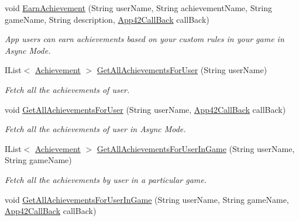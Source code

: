 \begin{DoxyCompactItemize}
void \hyperlink{classcom_1_1shephertz_1_1app42_1_1paas_1_1sdk_1_1csharp_1_1achievement_1_1_achievement_service_ab780775f471a6ac50605090d43a6c452}{Earn\+Achievement} (String user\+Name, String achievement\+Name, String game\+Name, String description, \hyperlink{interfacecom_1_1shephertz_1_1app42_1_1paas_1_1sdk_1_1csharp_1_1_app42_call_back}{App42\+Call\+Back} call\+Back)
\begin{DoxyCompactList}\small\item\em App users can earn achievements based on your custom rules in your game in Async Mode. \end{DoxyCompactList}\item 
I\+List$<$ \hyperlink{classcom_1_1shephertz_1_1app42_1_1paas_1_1sdk_1_1csharp_1_1achievement_1_1_achievement}{Achievement} $>$ \hyperlink{classcom_1_1shephertz_1_1app42_1_1paas_1_1sdk_1_1csharp_1_1achievement_1_1_achievement_service_a1fc9819af270d6e7adb8d58c9de0d46d}{Get\+All\+Achievements\+For\+User} (String user\+Name)
\begin{DoxyCompactList}\small\item\em Fetch all the achievements of user. \end{DoxyCompactList}\item 
void \hyperlink{classcom_1_1shephertz_1_1app42_1_1paas_1_1sdk_1_1csharp_1_1achievement_1_1_achievement_service_aec6ac7dc08157f05527922fdca7ad3c0}{Get\+All\+Achievements\+For\+User} (String user\+Name, \hyperlink{interfacecom_1_1shephertz_1_1app42_1_1paas_1_1sdk_1_1csharp_1_1_app42_call_back}{App42\+Call\+Back} call\+Back)
\begin{DoxyCompactList}\small\item\em Fetch all the achievements of user in Async Mode. \end{DoxyCompactList}\item 
I\+List$<$ \hyperlink{classcom_1_1shephertz_1_1app42_1_1paas_1_1sdk_1_1csharp_1_1achievement_1_1_achievement}{Achievement} $>$ \hyperlink{classcom_1_1shephertz_1_1app42_1_1paas_1_1sdk_1_1csharp_1_1achievement_1_1_achievement_service_a245fcc98f387b3eca3ec1ff271a1fc70}{Get\+All\+Achievements\+For\+User\+In\+Game} (String user\+Name, String game\+Name)
\begin{DoxyCompactList}\small\item\em Fetch all the achievements by user in a particular game. \end{DoxyCompactList}\item 
void \hyperlink{classcom_1_1shephertz_1_1app42_1_1paas_1_1sdk_1_1csharp_1_1achievement_1_1_achievement_service_a37c641a3019b41da497c72f6febdd8f3}{Get\+All\+Achievements\+For\+User\+In\+Game} (String user\+Name, String game\+Name, \hyperlink{interfacecom_1_1shephertz_1_1app42_1_1paas_1_1sdk_1_1csharp_1_1_app42_call_back}{App42\+Call\+Back} call\+Back)

\end{DoxyCompactItemize}
